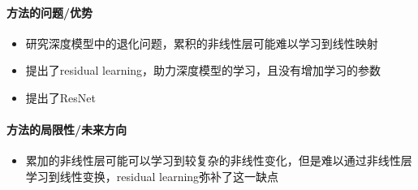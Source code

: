 \paragraph{方法的问题/优势}

\begin{itemize}

	\item 研究深度模型中的退化问题，累积的非线性层可能难以学习到线性映射
	\item 提出了residual learning，助力深度模型的学习，且没有增加学习的参数
	\item 提出了ResNet

\end{itemize}


\paragraph{方法的局限性/未来方向}

\begin{itemize}

	\item 累加的非线性层可能可以学习到较复杂的非线性变化，但是难以通过非线性层学习到线性变换，residual learning弥补了这一缺点
	

\end{itemize}